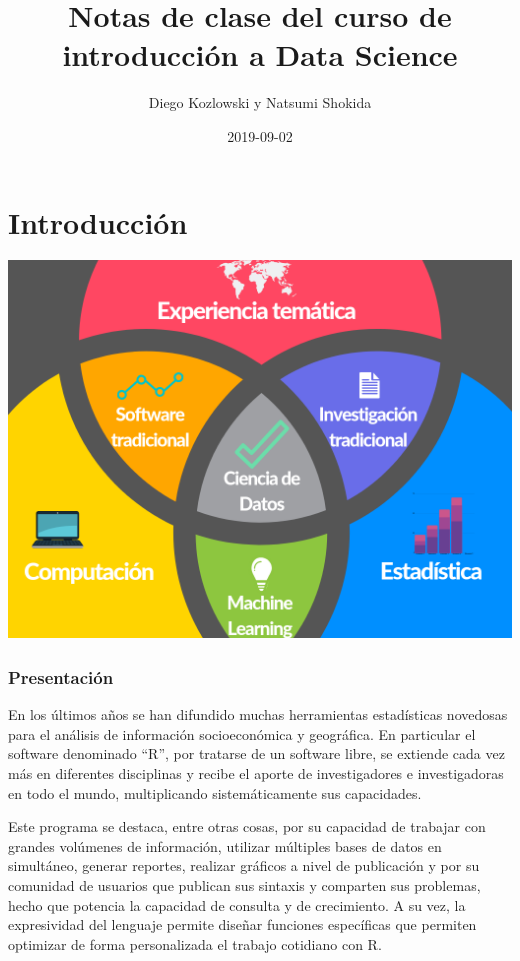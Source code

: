 \documentclass[]{book}
\title{Notas de clase del curso de introducción a Data Science}
\author{Diego Kozlowski y Natsumi Shokida}
\date{2019-09-02}
\begin{document}
\maketitle

{
\setcounter{tocdepth}{1}
\tableofcontents
}
\hypertarget{introduccion}{%
\chapter*{Introducción}\label{introduccion}}

\includegraphics[width=10.41667in,height=\textheight]{img/venn_ds.png}

\hypertarget{presentacion}{%
\subsection*{Presentación}\label{presentacion}}

En los últimos años se han difundido muchas herramientas estadísticas novedosas para el análisis de información socioeconómica y geográfica. En particular el software denominado ``R'', por tratarse de un software libre, se extiende cada vez más en diferentes disciplinas y recibe el aporte de investigadores e investigadoras en todo el mundo, multiplicando sistemáticamente sus capacidades.

Este programa se destaca, entre otras cosas, por su capacidad de trabajar con grandes volúmenes de información, utilizar múltiples bases de datos en simultáneo, generar reportes, realizar gráficos a nivel de publicación y por su comunidad de usuarios que publican sus sintaxis y comparten sus problemas, hecho que potencia la capacidad de consulta y de crecimiento. A su vez, la expresividad del lenguaje permite diseñar funciones específicas que permiten optimizar de forma personalizada el trabajo cotidiano con R.
\end{document}
